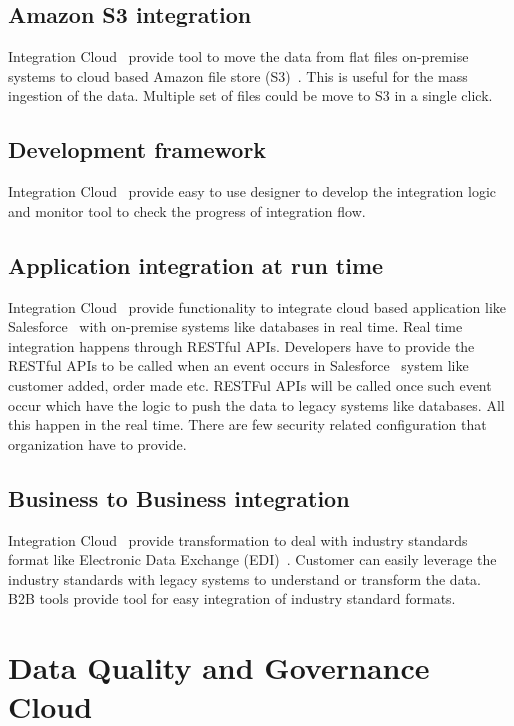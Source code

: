 \subsection{Amazon S3 integration}

Integration Cloud~\cite{hid-sp18-511-iics} provide tool to move the data from flat files on-premise systems to cloud based Amazon file store (S3)~\cite{hid-sp18-511-aws-s3}. This is useful for the mass ingestion of the data. Multiple set of files could be move to S3 in a single click.

\subsection{Development framework}

Integration Cloud~\cite{hid-sp18-511-iics} provide easy to use designer to develop the integration logic and monitor tool to check the progress of integration flow.

\subsection{Application integration at run time}

Integration Cloud~\cite{hid-sp18-511-iics} provide functionality to integrate cloud based application like Salesforce~\cite{hid-sp18-511-salesforce} with on-premise systems like databases in real time. Real time integration happens through RESTful APIs. Developers have to provide the RESTful APIs to be called when an event occurs in Salesforce~\cite{hid-sp18-511-salesforce} system like customer added, order made etc. RESTFul APIs will be called once such event occur which have the logic to push the data to legacy systems like databases. All this happen in the real time. There are few security related configuration that organization have to provide.

\subsection{Business to Business integration}

Integration Cloud~\cite{hid-sp18-511-iics} provide transformation to deal with industry standards format like Electronic Data Exchange (EDI)~\cite{hid-sp18-511-edi}. Customer can easily leverage the industry standards with legacy systems to understand or transform the data. B2B tools provide tool for easy integration of industry standard formats.

\section{Data Quality and Governance Cloud}

